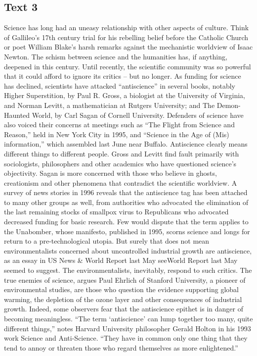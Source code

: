 \subsection{Text 3}
Science has long had an uneasy relationship with other aspects of culture. Think of Gallileo’s 17th century trial for his rebelling belief before the Catholic Church or poet William Blake’s harsh remarks against the mechanistic worldview of Isaac Newton. The schism between science and the humanities has, if anything, deepened in this century.
Until recently, the scientific community was so powerful that it could afford to ignore its critics -- but no longer. As funding for science has declined, scientists have attacked “antiscience” in several books, notably Higher Superstition, by Paul R. Gross, a biologist at the University of Virginia, and Norman Levitt, a mathematician at Rutgers University; and The Demon-Haunted World, by Carl Sagan of Cornell University.
Defenders of science have also voiced their concerns at meetings such as “The Flight from Science and Reason,” held in New York City in 1995, and “Science in the Age of (Mis) information,” which assembled last June near Buffalo.
Antiscience clearly means different things to different people. Gross and Levitt find fault primarily with sociologists, philosophers and other academics who have questioned science’s objectivity. Sagan is more concerned with those who believe in ghosts, creationism and other phenomena that contradict the scientific worldview.
A survey of news stories in 1996 reveals that the antiscience tag has been attached to many other groups as well, from authorities who advocated the elimination of the last remaining stocks of smallpox virus to Republicans who advocated decreased funding for basic research.
Few would dispute that the term applies to the Unabomber, whose manifesto, published in 1995, scorns science and longs for return to a pre-technological utopia. But surely that does not mean environmentalists concerned about uncontrolled industrial growth are antiscience, as an essay in US News \& World Report last May seeWorld Report last May seemed to suggest.
The environmentalists, inevitably, respond to such critics. The true enemies of science, argues Paul Ehrlich of Stanford University, a pioneer of environmental studies, are those who question the evidence supporting global warming, the depletion of the ozone layer and other consequences of industrial growth.
Indeed, some observers fear that the antiscience epithet is in danger of becoming meaningless. “The term ‘antiscience’ can lump together too many, quite different things,” notes Harvard University philosopher Gerald Holton in his 1993 work Science and Anti-Science. “They have in common only one thing that they tend to annoy or threaten those who regard themselves as more enlightened.”

